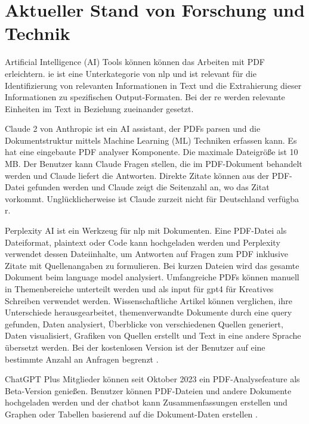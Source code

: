 \section{Aktueller Stand von Forschung und Technik}
Artificial Intelligence (AI) Tools können können das Arbeiten mit PDF erleichtern. \gls{ie} ist eine Unterkategorie von \gls{nlp} und ist relevant für die Identifizierung von relevanten Informationen in Text und die Extrahierung dieser Informationen zu spezifischen Output-Formaten. Bei der \gls{re} werden relevante Einheiten im Text in Beziehung zueinander gesetzt. 


Claude 2 von Anthropic ist ein AI assistant, der PDFs parsen und die Dokumentstruktur mittels Machine Learning (ML) Techniken erfassen kann. Es hat eine eingebaute PDF analyser Komponente. Die maximale Dateigröße ist 10 MB. Der Benutzer kann Claude Fragen stellen, die im PDF-Dokument behandelt werden und Claude liefert die Antworten. Direkte Zitate können aus der PDF-Datei gefunden werden und Claude zeigt die Seitenzahl an, wo das Zitat vorkommt. Unglücklicherweise ist Claude zurzeit nicht für Deutschland verfügba \cite{hackernoon-claude}r.

Perplexity AI ist ein Werkzeug für \gls{nlp} mit Dokumenten. Eine PDF-Datei als Dateiformat, plaintext oder Code kann hochgeladen werden und Perplexity verwendet dessen Dateiinhalte, um Antworten auf Fragen zum PDF inklusive Zitate mit Quellenangaben zu formulieren. Bei kurzen Dateien wird das gesamte Dokument beim language model analysiert. Umfangreiche PDFs können manuell in Themenbereiche unterteilt werden und als input für \gls{gpt4} für Kreatives Schreiben verwendet werden. Wissenschaftliche Artikel können verglichen, ihre Unterschiede herausgearbeitet, themenverwandte Dokumente durch eine query gefunden, Daten analysiert, Überblicke von verschiedenen Quellen generiert, Daten visualisiert, Grafiken von Quellen erstellt und Text in eine andere Sprache übersetzt werden. Bei der kostenlosen Version ist der Benutzer auf eine bestimmte Anzahl an Anfragen begrenzt \cite{hackernoon-claude}.

ChatGPT Plus Mitglieder können seit Oktober 2023 ein PDF-Analysefeature als Beta-Version genießen. Benutzer können PDF-Dateien und andere Dokumente hochgeladen werden und der chatbot kann Zusammenfassungen erstellen und Graphen oder Tabellen basierend auf die Dokument-Daten erstellen \cite{hackernoon-claude}.


